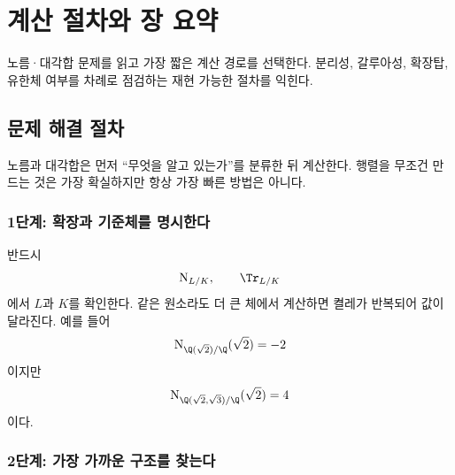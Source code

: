 \clearpage
\section{계산 절차와 장 요약}
\label{sec:norm-trace-workflow-review}

\begin{learninggoal}
노름·대각합 문제를 읽고 가장 짧은 계산 경로를 선택한다. 분리성, 갈루아성, 확장탑, 유한체 여부를 차례로 점검하는 재현 가능한 절차를 익힌다.
\end{learninggoal}

\subsection{문제 해결 절차}

\begin{keyidea}
노름과 대각합은 먼저 ``무엇을 알고 있는가''를 분류한 뒤 계산한다. 행렬을 무조건 만드는 것은 가장 확실하지만 항상 가장 빠른 방법은 아니다.
\end{keyidea}

\subsubsection*{1단계: 확장과 기준체를 명시한다}

반드시
\[
  \operatorname N_{L/K},
  \qquad
  \Tr_{L/K}
\]
에서 $L$과 $K$를 확인한다. 같은 원소라도 더 큰 체에서 계산하면 켤레가 반복되어 값이 달라진다. 예를 들어
\[
  \operatorname N_{\Q(\sqrt2)/\Q}(\sqrt2)=-2
\]
이지만
\[
  \operatorname N_{\Q(\sqrt2,\sqrt3)/\Q}(\sqrt2)=4
\]
이다.

\subsubsection*{2단계: 가장 가까운 구조를 찾는다}

